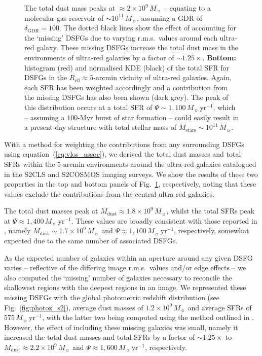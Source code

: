 \documentclass[a4paper, fleqn, usenatbib]{mnras}
\newcommand{\mdust}{M_{\text{dust}}}
\newcommand{\msol}{M_{\sun}}
\newcommand{\mstars}{M_{\text{stars}}}
\newcommand{\reff}{R_{\text{eff}}}
\newcommand{\urgs}{ultra-red galaxies}
\begin{document}
\begin{figure}
{    The total dust mass peaks at $\approx2\times10^{9}\,\msol{}$ -- equating to a molecular-gas reservoir of $\sim10^{11}\,\msol{}$, assuming a GDR of $\delta_{\text{GDR}}=100$.
    The dotted black lines show the effect of accounting for the `missing' DSFGs due to varying r.m.s.\ values around each ultra-red galaxy.
    These missing DSFGs increase the total dust mass in the environments of \urgs{} by a factor of $\sim1.25\times$.
    \textbf{Bottom:} histogram (red) and normalised KDE (black) of the total SFR for DSFGs in the $\reff{}\approx5\text{-}\text{arcmin}$ vicinity of ultra-red galaxies.
    Again, each SFR has been weighted accordingly and a contribution from the missing DSFGs has also been shown (dark grey).
    The peak of this distribution occurs at a total SFR of $\Psi\sim1{,}100\,\msol{}\,\text{yr}^{-1}$, which -- assuming a $100\text{-}\text{Myr}$ burst of star formation -- could easily result in a present-day structure with total stellar mass of $\mstars{}\sim10^{11}\,\msol{}$.}
    \label{fig:dust_masses}
\end{figure}

With a method for weighting the contributions from any surrounding DSFGs using equation~(\ref{eq:vlos_assoc}), we derived the total dust masses and total SFRs within the $5\text{-}\text{arcmin}$ environments around the \urgs{} catalogued in the S2CLS and S2COSMOS imaging surveys.
We show the results of these two properties in the top and bottom panels of Fig.~\ref{fig:dust_masses}, respectively, noting that these values exclude the contributions from the central \urgs{}.

The total dust masses peak at $\mdust{}\approx1.8\times10^{9}\,\msol{}$, whilst the total SFRs peak at $\Psi\approx1{,}400\,\msol{}\,\text{yr}^{-1}$.
These values are broadly consistent with those reported in , namely $\mdust{}\sim1.7\times10^{9}\,\msol{}$ and $\Psi\approx1{,}100\,\msol{}\,\text{yr}^{-1}$, respectively, somewhat expected due to the same number of associated DSFGs.

As the expected number of galaxies within an aperture around any given DSFG varies -- reflective of the differing image r.m.s.\ values and/or edge effects -- we also computed the `missing' number of galaxies necessary to reconcile the shallowest regions with the deepest regions in an image.
We represented these missing DSFGs with the global photometric redshift distribution (see Fig.~\ref{fig:photoz_s2}), average dust masses of $1.2\times10^{9}\,\msol{}$ and average SFRs of $575\,\msol{}\,\text{yr}^{-1}$, with the latter two being computed using the method outlined in \citet{barlow04}.
However, the effect of including these missing galaxies was small, namely it increased the total dust masses and total SFRs by a factor of $\sim1.25\times$ to $\mdust{}\approx2.2\times10^{9}\,\msol{}$ and $\Psi\approx1{,}600\,\msol{}\,\text{yr}^{-1}$, respectively.
\end{document}
